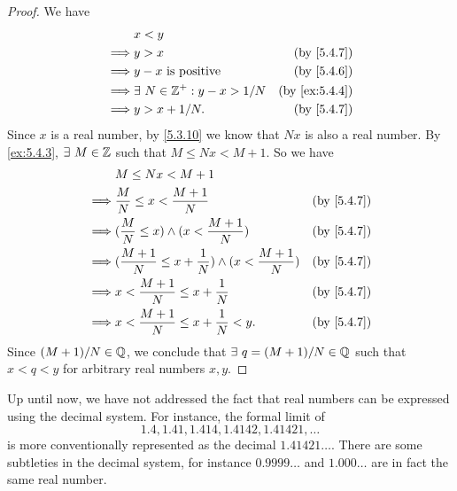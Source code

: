\begin{proof}
  We have
  \begin{align*}
             & x < y                                                             \\
    \implies & y > x                               & \text{(by \cref{5.4.7})}    \\
    \implies & y - x \text{ is positive}           & \text{(by \cref{5.4.6})}    \\
    \implies & \exists\ N \in \Z^+ : y - x > 1 / N & \text{(by \cref{ex:5.4.4})} \\
    \implies & y > x + 1 / N.                      & \text{(by \cref{5.4.7})}    \\
  \end{align*}
  Since \(x\) is a real number, by \cref{5.3.10} we know that \(Nx\) is also a real number.
  By \cref{ex:5.4.3}, \(\exists\ M \in \mathbb{Z}\) such that \(M \leq Nx < M + 1\).
  So we have
  \begin{align*}
             & M \leq Nx < M + 1                                                                             \\
    \implies & \frac{M}{N} \leq x < \frac{M + 1}{N}                               & \text{(by \cref{5.4.7})} \\
    \implies & (\frac{M}{N} \leq x) \land (x < \frac{M + 1}{N})                   & \text{(by \cref{5.4.7})} \\
    \implies & (\frac{M + 1}{N} \leq x + \frac{1}{N}) \land (x < \frac{M + 1}{N}) & \text{(by \cref{5.4.7})} \\
    \implies & x < \frac{M + 1}{N} \leq x + \frac{1}{N}                           & \text{(by \cref{5.4.7})} \\
    \implies & x < \frac{M + 1}{N} \leq x + \frac{1}{N} < y.                      & \text{(by \cref{5.4.7})}
  \end{align*}
  Since \((M + 1) / N \in \mathbb{Q}\), we conclude that \(\exists\ q = (M + 1) / N \in \mathbb{Q}\) such that \(x < q < y\) for arbitrary real numbers \(x, y\).
\end{proof}

\begin{rmk}\label{5.4.15}
  Up until now, we have not addressed the fact that real numbers can be expressed using the decimal system.
  For instance, the formal limit of
  \[
    1.4, 1.41, 1.414, 1.4142, 1.41421, \dots
  \]
  is more conventionally represented as the decimal \(1.41421\dots\).
  There are some subtleties in the decimal system, for instance \(0.9999\dots\) and \(1.000\dots\) are in fact the same real number.
\end{rmk}

